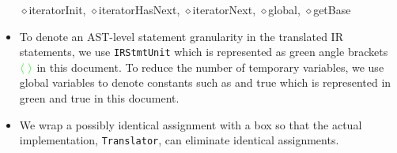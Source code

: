 \begin{itemize}
{\sf \ensuremath{\diamond}iteratorInit}, {\sf \ensuremath{\diamond}iteratorHasNext}, {\sf \ensuremath{\diamond}iteratorNext},
{\sf \ensuremath{\diamond}global}, {\sf \ensuremath{\diamond}getBase}
\item To denote an AST-level statement granularity in the translated IR statements,
we use {\tt IRStmtUnit} which is represented as green angle brackets {\ingreen ${\color{green}\langle}\ {\color{green}\rangle}$} in this document.
To reduce the number of temporary variables, we use global variables to denote constants such as {} and
{\sf true} which is represented in green {\ingreen{}} and  {\ingreen\sf true} in this document.
\item We wrap a possibly identical assignment with a box so that the actual implementation, {\tt Translator}, can eliminate identical assignments.
\end{itemize}
